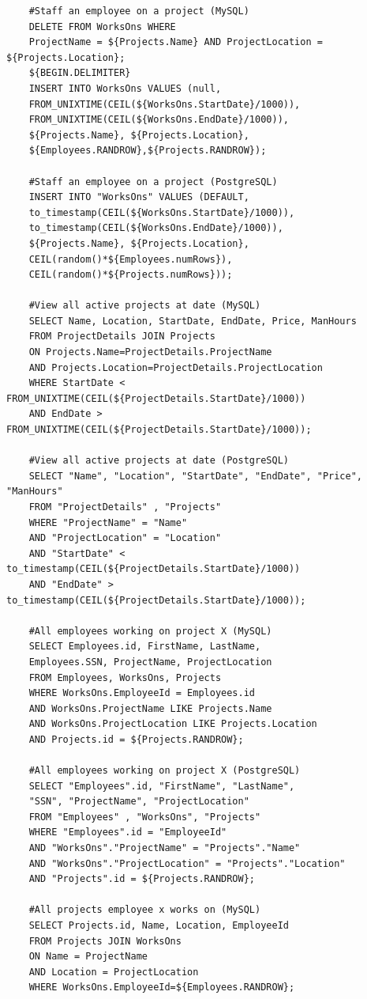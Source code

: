 \documentclass[12pt]{report}
\begin{document}
\begin{spacing}{1.9}
\begin{verbatim}
	#Staff an employee on a project (MySQL)
	DELETE FROM WorksOns WHERE 
	ProjectName = ${Projects.Name} AND ProjectLocation = ${Projects.Location};
	${BEGIN.DELIMITER}
	INSERT INTO WorksOns VALUES (null,
	FROM_UNIXTIME(CEIL(${WorksOns.StartDate}/1000)),
	FROM_UNIXTIME(CEIL(${WorksOns.EndDate}/1000)),
	${Projects.Name}, ${Projects.Location},
	${Employees.RANDROW},${Projects.RANDROW});
	
	#Staff an employee on a project (PostgreSQL)
	INSERT INTO "WorksOns" VALUES (DEFAULT,
	to_timestamp(CEIL(${WorksOns.StartDate}/1000)),
	to_timestamp(CEIL(${WorksOns.EndDate}/1000)),
	${Projects.Name}, ${Projects.Location},
	CEIL(random()*${Employees.numRows}),
	CEIL(random()*${Projects.numRows}));
	
	#View all active projects at date (MySQL)
	SELECT Name, Location, StartDate, EndDate, Price, ManHours 
	FROM ProjectDetails JOIN Projects 
	ON Projects.Name=ProjectDetails.ProjectName 
	AND Projects.Location=ProjectDetails.ProjectLocation
	WHERE StartDate < FROM_UNIXTIME(CEIL(${ProjectDetails.StartDate}/1000)) 
	AND EndDate > FROM_UNIXTIME(CEIL(${ProjectDetails.StartDate}/1000));
	
	#View all active projects at date (PostgreSQL)
	SELECT "Name", "Location", "StartDate", "EndDate", "Price", "ManHours" 
	FROM "ProjectDetails" , "Projects"
	WHERE "ProjectName" = "Name" 
	AND "ProjectLocation" = "Location"
	AND "StartDate" < to_timestamp(CEIL(${ProjectDetails.StartDate}/1000))
	AND "EndDate" > to_timestamp(CEIL(${ProjectDetails.StartDate}/1000));
	
	#All employees working on project X (MySQL)
	SELECT Employees.id, FirstName, LastName, 
	Employees.SSN, ProjectName, ProjectLocation 
	FROM Employees, WorksOns, Projects 
	WHERE WorksOns.EmployeeId = Employees.id 
	AND WorksOns.ProjectName LIKE Projects.Name 
	AND WorksOns.ProjectLocation LIKE Projects.Location
	AND Projects.id = ${Projects.RANDROW};
	
	#All employees working on project X (PostgreSQL)
	SELECT "Employees".id, "FirstName", "LastName", 
	"SSN", "ProjectName", "ProjectLocation"
	FROM "Employees" , "WorksOns", "Projects"
	WHERE "Employees".id = "EmployeeId"
	AND "WorksOns"."ProjectName" = "Projects"."Name"
	AND "WorksOns"."ProjectLocation" = "Projects"."Location"
	AND "Projects".id = ${Projects.RANDROW};
	
	#All projects employee x works on (MySQL)
	SELECT Projects.id, Name, Location, EmployeeId 
	FROM Projects JOIN WorksOns 
	ON Name = ProjectName 
	AND Location = ProjectLocation
	WHERE WorksOns.EmployeeId=${Employees.RANDROW};
	

\end{verbatim}
\end{spacing}
\end{document}
